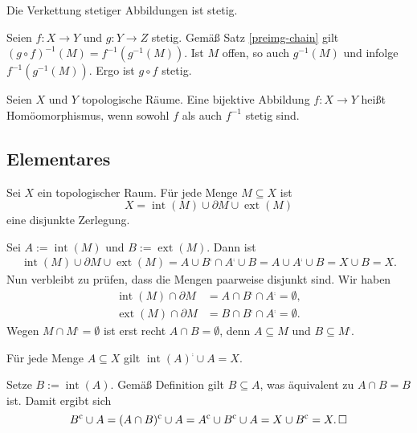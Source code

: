 \begin{Satz}
Die Verkettung stetiger Abbildungen ist stetig.
\end{Satz}
\begin{Beweis}
Seien $f\colon X\to Y$ und $g\colon Y\to Z$ stetig.
Gemäß Satz \ref{preimg-chain} gilt $(g\circ f)^{-1}(M)=f^{-1}(g^{-1}(M))$.
Ist $M$ offen, so auch $g^{-1}(M)$ und infolge $f^{-1}(g^{-1}(M))$.
Ergo ist $g\circ f$ stetig.\,\qedsymbol
\end{Beweis}

\begin{Definition}[Homöomorphismus]\newlinefirst
Seien $X$ und $Y$ topologische Räume. Eine bijektive Abbildung
$f\colon X\to Y$ heißt Homöomorphismus, wenn sowohl $f$ als auch
$f^{-1}$ stetig sind.
\end{Definition}

\newpage
\subsection{Elementares}

\begin{Satz}\label{partition-int-bd-ext}
Sei $X$ ein topologischer Raum. Für jede Menge $M\subseteq X$ ist%
\[X = \operatorname{int}(M)\cup\partial M\cup\operatorname{ext}(M)\]
eine disjunkte Zerlegung.
\end{Satz}
\begin{Beweis} Sei $A:=\operatorname{int}(M)$ und $B:=\operatorname{ext}(M)$. Dann ist
\begin{gather*}
\operatorname{int}(M)\cup\partial M\cup\operatorname{ext}(M)
= A\cup B^\comp\cap A^\comp\cup B
= A\cup A^\comp\cup B = X\cup B = X.
\end{gather*}
Nun verbleibt zu prüfen, dass die Mengen paarweise disjunkt sind. Wir haben%
\begin{align*}
\operatorname{int}(M)\cap\partial M &= A\cap B^\comp\cap A^\comp = \emptyset,\\
\operatorname{ext}(M)\cap\partial M &= B\cap B^\comp\cap A^\comp = \emptyset.
\end{align*}
Wegen $M\cap M^\comp=\emptyset$ ist erst recht $A\cap B=\emptyset$,
denn $A\subseteq M$ und $B\subseteq M^\comp$.\,\qedsymbol
\end{Beweis}

\begin{Satz}
Für jede Menge $A\subseteq X$ gilt $\operatorname{int}(A)^\comp\cup A = X$.
\end{Satz}
\begin{Beweis}
Setze $B:=\operatorname{int}(A)$. Gemäß Definition gilt $B\subseteq A$,
was äquivalent zu $A\cap B = B$ ist. Damit ergibt sich
\[B^\mathrm c\cup A = (A\cap B)^\mathrm c\cup A = A^\mathrm c\cup B^\mathrm c\cup A
= X\cup B^\mathrm c = X.\,\square\]
\end{Beweis}

